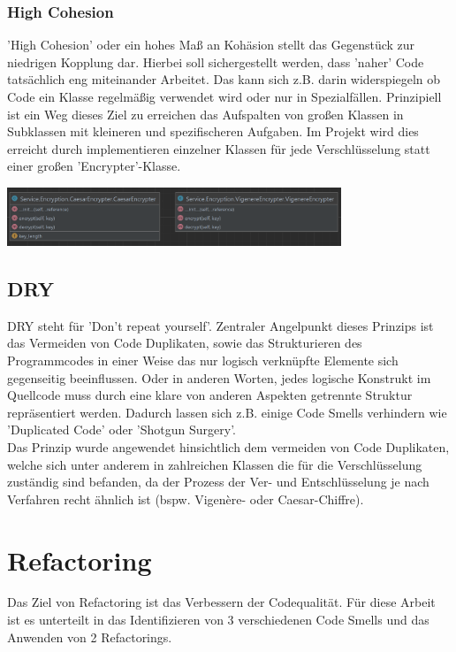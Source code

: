 \documentclass[12pt]{article}
\begin{document}
\subsubsection{High Cohesion}
'High Cohesion' oder ein hohes Maß an Kohäsion stellt das Gegenstück zur niedrigen Kopplung dar. Hierbei soll sichergestellt werden, dass 'naher' Code tatsächlich eng miteinander Arbeitet. Das kann sich z.B. darin widerspiegeln ob Code ein Klasse regelmäßig verwendet wird oder nur in Spezialfällen. Prinzipiell ist ein Weg dieses Ziel zu erreichen das Aufspalten von großen Klassen in Subklassen mit kleineren und spezifischeren Aufgaben. Im Projekt wird dies erreicht durch implementieren einzelner Klassen für jede Verschlüsselung statt einer großen 'Encrypter'-Klasse.
\begin{center}
	\includegraphics[width=10cm]{bilder/High_Cohesion.png}
\end{center}

\subsection{DRY}
DRY steht für 'Don't repeat yourself'. Zentraler Angelpunkt dieses Prinzips ist das Vermeiden von Code Duplikaten, sowie das Strukturieren des Programmcodes in einer Weise das nur logisch verknüpfte Elemente sich gegenseitig beeinflussen. Oder in anderen Worten, jedes logische Konstrukt im Quellcode muss durch eine klare von anderen Aspekten getrennte Struktur repräsentiert werden. Dadurch lassen sich z.B. einige Code Smells verhindern wie 'Duplicated Code' oder 'Shotgun Surgery'.\\
Das Prinzip wurde angewendet hinsichtlich dem vermeiden von Code Duplikaten, welche sich unter anderem in zahlreichen Klassen die für die Verschlüsselung zuständig sind befanden, da der Prozess der Ver- und Entschlüsselung je nach Verfahren recht ähnlich ist (bspw. Vigenère- oder Caesar-Chiffre).

\newpage

\section{Refactoring}
Das Ziel von Refactoring ist das Verbessern der Codequalität. Für diese Arbeit ist es unterteilt in das Identifizieren von 3 verschiedenen Code Smells und das Anwenden von 2 Refactorings.
\end{document}
